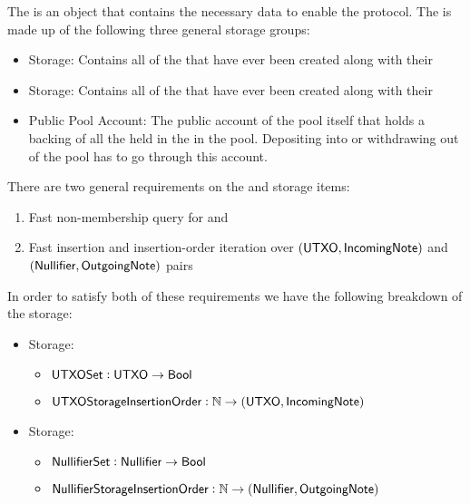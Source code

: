 
The \ShieldedPool{} is an object that contains the necessary data to enable the \MantaPay{} \Transfer{} protocol. The \ShieldedPool{} is made up of the following three general storage groups:

\begin{itemize}
    \item \UTXO{} Storage: Contains all of the  that have ever been created along with their 
    \item \Nullifier{} Storage: Contains all of the  that have ever been created along with their 
    \item Public Pool Account: The public account of the pool itself that holds a backing of all the  held in the  in the pool. Depositing into or withdrawing out of the pool has to go through this account.
\end{itemize}

There are two general requirements on the \UTXO{} and \Nullifier{} storage items:

\begin{enumerate}
    \item Fast non-membership query for  and 
    \item Fast insertion and insertion-order iteration over $({\textsf{UTXO}}{}, {\textsf{IncomingNote}}{})$ and $({\textsf{Nullifier}}{}, {\textsf{OutgoingNote}}{})$ pairs
\end{enumerate}

In order to satisfy both of these requirements we have the following breakdown of the storage:

\begin{itemize}
    \item \UTXO{} Storage:
        \begin{itemize}
            \item ${\textsf{UTXOSet}}: {\textsf{UTXO}} \to {\textsf{Bool}}$
            \item ${\textsf{UTXOStorageInsertionOrder}}: \mathbb{N} \to ({\textsf{UTXO}}, {\textsf{IncomingNote}})$
        \end{itemize}
    \item \Nullifier{} Storage:
        \begin{itemize}
            \item ${\textsf{NullifierSet}}: {\textsf{Nullifier}} \to {\textsf{Bool}}$
            \item ${\textsf{NullifierStorageInsertionOrder}}: \mathbb{N} \to ({\textsf{Nullifier}}, {\textsf{OutgoingNote}})$
        \end{itemize}
\end{itemize}

